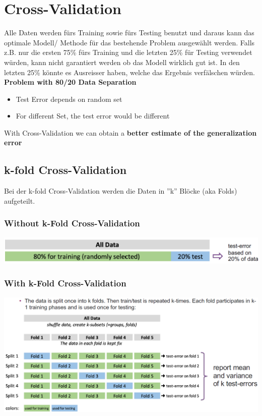 \section{Cross-Validation}
Alle Daten werden fürs Training sowie fürs Testing benutzt und daraus kann das optimale Modell/ Methode für das bestehende Problem ausgewählt werden.
Falls z.B. nur die ersten 75\% fürs Training und die letzten 25\% für Testing verwendet würden, kann nicht garantiert werden ob das Modell wirklich gut ist. In den letzten 25\% könnte es Ausreisser haben, welche das Ergebnis verfälschen würden.\\
\textbf{Problem with 80/20 Data Separation}
\begin{itemize}
    \item Test Error depends on random set
    \item For different Set, the test error would be different
\end{itemize}
With Cross-Validation we can obtain a \textbf{better estimate of the generalization error}

\subsection{k-fold Cross-Validation}
Bei der k-fold Cross-Validation werden die Daten in ''k'' Blöcke (aka Folds) aufgeteilt.\\

\subsubsection{Without k-Fold Cross-Validation}
\includegraphics[width=\linewidth]{./img/k_fold.png}

\subsubsection{With k-Fold Cross-Validation}
\includegraphics[width=\linewidth]{./img/k_fold2.png}

